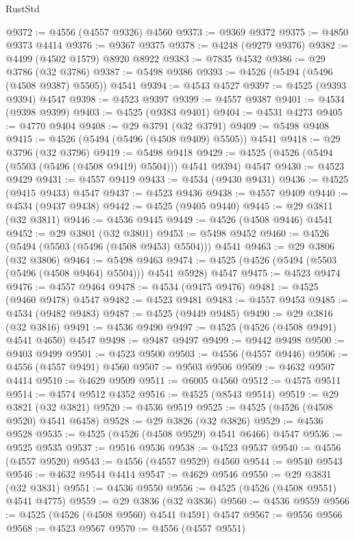 \begin{lexlean}{RustStd}
\begin{coremodule}
@9372 := @4556 (@4557 @9326) @4560
@9373 := @9369 @9372
@9375 := @4850 @9373 @4414
@9376 := @9367 @9375
@9378 := @4248 (@9279 @9376)
@9382 := @4499 (@4502 @1579) @8920 @8922
@9383 := @7835 @4532
@9386 := @29 @3786 (@32 @3786)
@9387 := @5498 @9386
@9393 := @4526 (@5494 (@5496 (@4508 @9387) @5505)) @4541
@9394 := @4543 @4527
@9397 := @4525 (@9393 @9394) @4547
@9398 := @4523 @9397
@9399 := @4557 @9387
@9401 := @4534 (@9398 @9399)
@9403 := @4525 (@9383 @9401)
@9404 := @4531 @4273
@9405 := @4770 @9404
@9408 := @29 @3791 (@32 @3791)
@9409 := @5498 @9408
@9415 := @4526 (@5494 (@5496 (@4508 @9409) @5505)) @4541
@9418 := @29 @3796 (@32 @3796)
@9419 := @5498 @9418
@9429 := @4525 (@4526 (@5494 (@5503 (@5496 (@4508 @9419) @5504))) @4541 @9394) @4547
@9430 := @4523 @9429
@9431 := @4557 @9419
@9433 := @4534 (@9430 @9431)
@9436 := @4525 (@9415 @9433) @4547
@9437 := @4523 @9436
@9438 := @4557 @9409
@9440 := @4534 (@9437 @9438)
@9442 := @4525 (@9405 @9440)
@9445 := @29 @3811 (@32 @3811)
@9446 := @4536 @9445
@9449 := @4526 (@4508 @9446) @4541
@9452 := @29 @3801 (@32 @3801)
@9453 := @5498 @9452
@9460 := @4526 (@5494 (@5503 (@5496 (@4508 @9453) @5504))) @4541
@9463 := @29 @3806 (@32 @3806)
@9464 := @5498 @9463
@9474 := @4525 (@4526 (@5494 (@5503 (@5496 (@4508 @9464) @5504))) @4541 @5928) @4547
@9475 := @4523 @9474
@9476 := @4557 @9464
@9478 := @4534 (@9475 @9476)
@9481 := @4525 (@9460 @9478) @4547
@9482 := @4523 @9481
@9483 := @4557 @9453
@9485 := @4534 (@9482 @9483)
@9487 := @4525 (@9449 @9485)
@9490 := @29 @3816 (@32 @3816)
@9491 := @4536 @9490
@9497 := @4525 (@4526 (@4508 @9491) @4541 @4650) @4547
@9498 := @9487 @9497
@9499 := @9442 @9498
@9500 := @9403 @9499
@9501 := @4523 @9500
@9503 := @4556 (@4557 @9446)
@9506 := @4556 (@4557 @9491) @4560
@9507 := @9503 @9506
@9509 := @4632 @9507 @4414
@9510 := @4629 @9509
@9511 := @6005 @4560
@9512 := @4575 @9511
@9514 := @4574 @9512 @4352
@9516 := @4525 (@8543 @9514)
@9519 := @29 @3821 (@32 @3821)
@9520 := @4536 @9519
@9525 := @4525 (@4526 (@4508 @9520) @4541 @6458)
@9528 := @29 @3826 (@32 @3826)
@9529 := @4536 @9528
@9535 := @4525 (@4526 (@4508 @9529) @4541 @6466) @4547
@9536 := @9525 @9535
@9537 := @9516 @9536
@9538 := @4523 @9537
@9540 := @4556 (@4557 @9520)
@9543 := @4556 (@4557 @9529) @4560
@9544 := @9540 @9543
@9546 := @4632 @9544 @4414
@9547 := @4629 @9546
@9550 := @29 @3831 (@32 @3831)
@9551 := @4536 @9550
@9556 := @4525 (@4526 (@4508 @9551) @4541 @4775)
@9559 := @29 @3836 (@32 @3836)
@9560 := @4536 @9559
@9566 := @4525 (@4526 (@4508 @9560) @4541 @4591) @4547
@9567 := @9556 @9566
@9568 := @4523 @9567
@9570 := @4556 (@4557 @9551)

\end{coremodule}
\end{lexlean}
